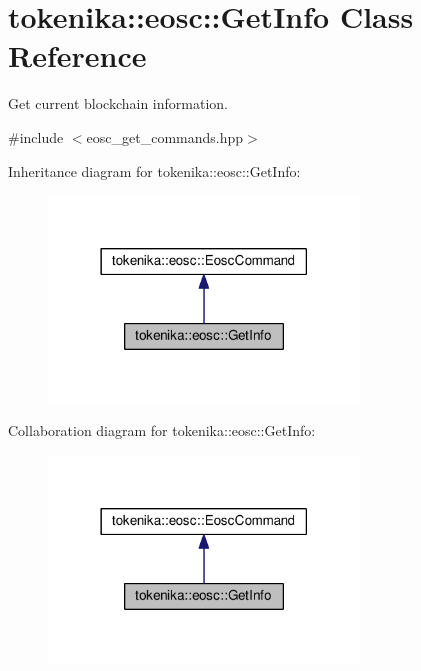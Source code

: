 \hypertarget{classtokenika_1_1eosc_1_1_get_info}{}\section{tokenika\+:\+:eosc\+:\+:Get\+Info Class Reference}
\label{classtokenika_1_1eosc_1_1_get_info}


Get current blockchain information.  




{\ttfamily \#include $<$eosc\+\_\+get\+\_\+commands.\+hpp$>$}



Inheritance diagram for tokenika\+:\+:eosc\+:\+:Get\+Info\+:
\nopagebreak
\begin{figure}[H]
\begin{center}
\leavevmode
\includegraphics[width=234pt]{classtokenika_1_1eosc_1_1_get_info__inherit__graph}
\end{center}
\end{figure}


Collaboration diagram for tokenika\+:\+:eosc\+:\+:Get\+Info\+:
\nopagebreak
\begin{figure}[H]
\begin{center}
\leavevmode
\includegraphics[width=234pt]{classtokenika_1_1eosc_1_1_get_info__coll__graph}
\end{center}
\end{figure}
